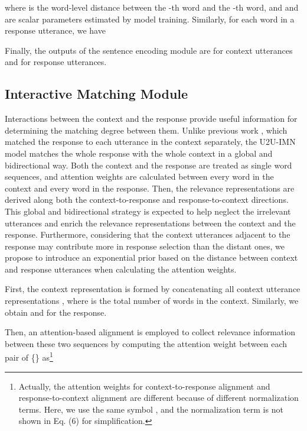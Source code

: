 \documentclass[journal]{IEEEtran}
\begin{document}
    where  is the word-level distance between the -th word and the -th word, and  and  are scalar parameters estimated by model training.
    Similarly, for each word in a response utterance, we have
    

    Finally, the outputs of the sentence encoding module are  for context utterances and  for response utterances.


  \subsection{Interactive Matching Module} \label{sec:imm}

    Interactions between the context and the response provide useful information for determining the matching degree between them.
    Unlike previous work \cite{DBLP:conf/acl/WuWXZL17,DBLP:conf/acl/WuLCZDYZL18,DBLP:conf/coling/ZhangLZZL18}, which matched the response to each utterance in the context separately, the U2U-IMN model matches the whole response with the whole context in a global and bidirectional way.
    Both the context and the response are treated as single word sequences, and attention weights are calculated between every word in the context and every word in the response.
    Then, the relevance representations are derived along both the context-to-response and response-to-context directions.
    This global and bidirectional strategy is expected to help neglect the irrelevant utterances and  enrich the relevance representations between the context and the response.
    Furthermore, considering that the context utterances adjacent to the response may contribute more in response selection than the distant ones, we propose to introduce an exponential prior based on the distance between context and response utterances when calculating the attention weights.

    First, the context representation  is formed by concatenating all context utterance representations , where  is the total number of words in the context.
    Similarly, we obtain  and  for the response.

    Then, an attention-based alignment is employed to collect relevance information between these two sequences by computing the attention weight between each pair of \{\}
    as\footnote{Actually, the attention weights for context-to-response alignment and response-to-context alignment are different because of different normalization terms.
    Here, we use the same symbol , and the normalization term is not shown in Eq. (6) for simplification. }
    
\end{document}
